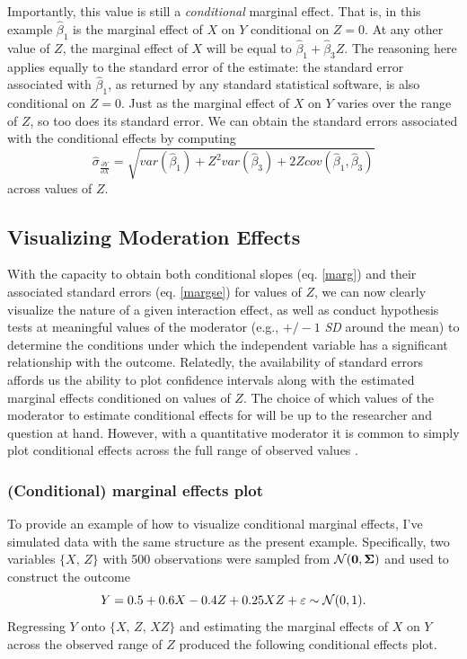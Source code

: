 Importantly, this value is still a \textit{conditional} marginal effect. That is, in this example $\hat{\beta}_1$ is the marginal effect of $X$ on $Y$ conditional on $Z = 0$. At any other value of $Z$, the marginal effect of $X$ will be equal to $\hat{\beta}_1 + \hat{\beta}_3 Z$. The reasoning here applies equally to the standard error of the estimate: the standard error associated with $\hat{\beta}_1$, as returned by any standard statistical software, is also conditional on $Z = 0$. Just as the marginal effect of $X$ on $Y$ varies over the range of $Z$, so too does its standard error. We can obtain the standard errors associated with the conditional effects by computing
\begin{equation} \label{margse}
    \hat{\sigma}_{\frac{\partial Y}{\partial X}} = \sqrt{var(\hat{\beta}_1) + Z^2 var(\hat{\beta}_3) + 2Z cov(\hat{\beta}_1, \hat{\beta}_3)}
\end{equation}
across values of $Z$. 

\subsection{Visualizing Moderation Effects}
With the capacity to obtain both conditional slopes (eq. \ref{marg}) and their associated standard errors (eq. \ref{margse}) for values of $Z$, we can now clearly visualize the nature of a given interaction effect, as well as conduct hypothesis tests at meaningful values of the moderator (e.g., $+/-1$ \textit{SD} around the mean) to determine the conditions under which the independent variable has a significant relationship with the outcome. Relatedly, the availability of standard errors affords us the ability to plot confidence intervals along with the estimated marginal effects conditioned on values of $Z$. The choice of which values of the moderator to estimate conditional effects for will be up to the researcher and question at hand. However, with a quantitative moderator it is common to simply plot conditional effects across the full range of observed values \cite{hainmueller2019much}.

\subsubsection{(Conditional) marginal effects plot}
To provide an example of how to visualize conditional marginal effects, I've simulated data with the same structure as the present example. Specifically, two variables $\{X,\,Z\}$ with 500 observations were sampled from $\mathcal{N}(\mathbf{0}, \bm{\Sigma})$ and used to construct the outcome 
\begin{equation} \label{simmod}
    Y = 0.5 + 0.6 X - 0.4 Z + 0.25 X Z + \varepsilon \sim \mathcal{N}(0, 1).
\end{equation}
Regressing $Y$ onto $\{X,\,Z,\,XZ\}$ and estimating the marginal effects of $X$ on $Y$ across the observed range of $Z$ produced the following conditional effects plot.


